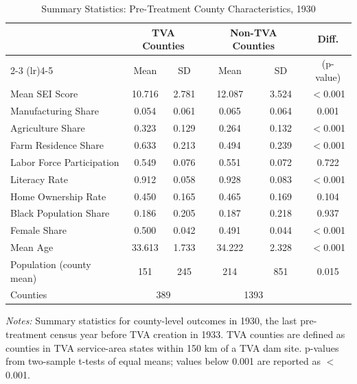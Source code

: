 \begin{table}[htbp]
\centering
\caption{Summary Statistics: Pre-Treatment County Characteristics, 1930}
\label{tab:summary}
\begin{tabular}{lccccc}
\toprule
 & \multicolumn{2}{c}{TVA Counties} & \multicolumn{2}{c}{Non-TVA Counties} & Diff. \\
\cmidrule(lr){2-3} \cmidrule(lr){4-5}
 & Mean & SD & Mean & SD & (p-value) \\
\midrule
Mean SEI Score & 10.716 & 2.781 & 12.087 & 3.524 & $<$0.001 \\
Manufacturing Share & 0.054 & 0.061 & 0.065 & 0.064 & 0.001 \\
Agriculture Share & 0.323 & 0.129 & 0.264 & 0.132 & $<$0.001 \\
Farm Residence Share & 0.633 & 0.213 & 0.494 & 0.239 & $<$0.001 \\
Labor Force Participation & 0.549 & 0.076 & 0.551 & 0.072 & 0.722 \\
Literacy Rate & 0.912 & 0.058 & 0.928 & 0.083 & $<$0.001 \\
Home Ownership Rate & 0.450 & 0.165 & 0.465 & 0.169 & 0.104 \\
Black Population Share & 0.186 & 0.205 & 0.187 & 0.218 & 0.937 \\
Female Share & 0.500 & 0.042 & 0.491 & 0.044 & $<$0.001 \\
Mean Age & 33.613 & 1.733 & 34.222 & 2.328 & $<$0.001 \\
Population (county mean) & 151 & 245 & 214 & 851 & 0.015 \\
\midrule
Counties & \multicolumn{2}{c}{389} & \multicolumn{2}{c}{1393} & \\
\bottomrule
\end{tabular}
\begin{minipage}{0.95\textwidth}
\vspace{0.5em}
\footnotesize
\textit{Notes:} Summary statistics for county-level outcomes in 1930, the last pre-treatment census year before TVA creation in 1933. TVA counties are defined as counties in TVA service-area states within 150 km of a TVA dam site. p-values from two-sample t-tests of equal means; values below 0.001 are reported as $<$0.001.
\end{minipage}
\end{table}
